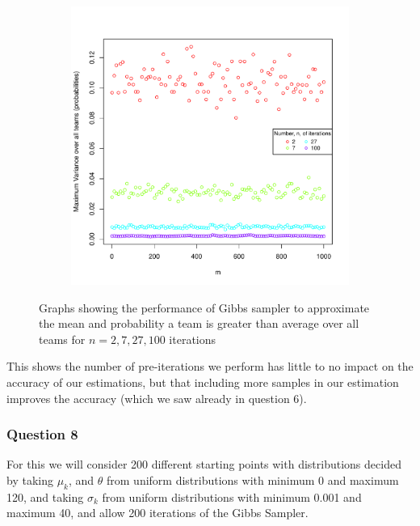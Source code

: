 \documentclass[11pt]{article} %
\begin{document}
\begin{figure}[h]
\begin{subfigure}{0.48\textwidth}
		\includegraphics[width=1.0\textwidth]{"../R File/var_probs_3"}
	\end{subfigure}	
	\caption{Graphs showing the performance of Gibbs sampler to approximate the mean and probability a team is greater than average over all teams for $n=2, 7, 27, 100$ iterations}
	\label{fig:sample_vars_3}
\end{figure} This shows the number of pre-iterations we perform has little to no impact on the accuracy of our estimations, but that including more samples in our estimation improves the accuracy (which we saw already in question 6).

\subsubsection*{Question 8}

For this we will consider 200 different starting points with distributions decided by taking $\mu_k$, and $\theta$ from uniform distributions with minimum 0 and maximum 120, and taking $\sigma_k$ from uniform distributions with minimum 0.001 and maximum 40, and allow 200 iterations of the Gibbs Sampler.\\
\end{document}
